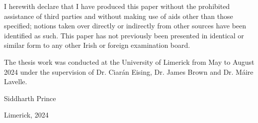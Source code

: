 


\begin{declaration}        %

I herewith declare that I have produced this paper without the prohibited assistance of third parties and without making use of aids other than those specified; notions taken over directly or indirectly from other sources have been identified as such. This paper has not previously been presented in identical or similar form to any other Irish or foreign examination board.

The thesis work was conducted at the University of Limerick from May to August 2024 under the supervision of Dr. Ciarán Eising, Dr. James Brown and Dr. Máire Lavelle. 

\vspace{10mm}

Siddharth Prince  

Limerick, 2024


\end{declaration}


